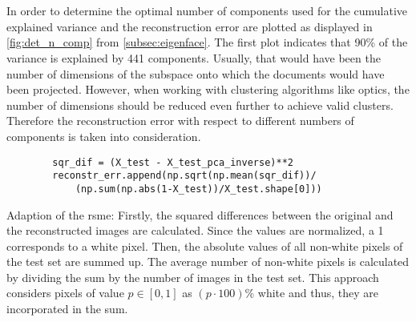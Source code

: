 \section{\eigendocs{}}\label{sec:evaluation-eigendocs}

In order to determine the optimal number of components used for \eigendocs{} the cumulative explained variance and the reconstruction error are plotted 
as displayed in \autoref{fig:det_n_comp} from \autoref{subsec:eigenface}.
The first plot indicates that 90\% of the variance is explained by 441 components.
Usually, that would have been the number of dimensions of the subspace onto which the documents would have been projected.
However, when working with clustering algorithms like \ac{optics}, the number of dimensions should be reduced even further to achieve valid clusters.
Therefore the reconstruction error with respect to different numbers of components is taken into consideration.

\begin{listing}[htp]
    \begin{verbatim}
        sqr_dif = (X_test - X_test_pca_inverse)**2
        reconstr_err.append(np.sqrt(np.mean(sqr_dif))/
            (np.sum(np.abs(1-X_test))/X_test.shape[0])) 
    \end{verbatim}
    \caption[Adaption of the \ac{rsme}]{
        Adaption of the \ac{rsme}: 
        Firstly, the squared differences between the original and the reconstructed images are calculated.
        Since the values are normalized, a 1 corresponds to a white pixel.
        Then, the absolute values of all non-white pixels of the test set are summed up.
        The average number of non-white pixels is calculated by dividing the sum by the number of images in the test set.
        This approach considers pixels of value $p \in [0,1]$ as $(p \cdot 100)$\% white and thus, they are incorporated in the sum.
    }
    \label{lst:impl-weighted-rsme}
\end{listing}

